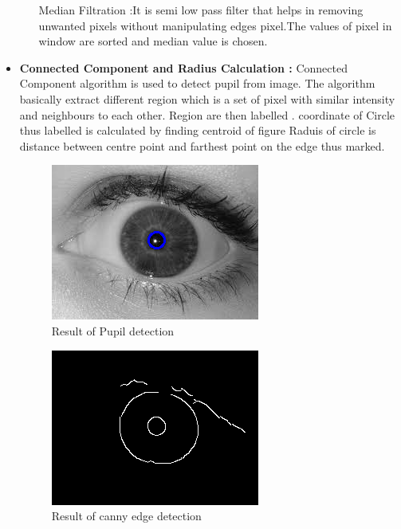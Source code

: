 \documentclass[conference]{Iris_detect}
\begin{document}
\begin{itemize}
\begin{itemize}
Median Filtration :It is semi low pass filter that helps in removing unwanted pixels without manipulating edges pixel.The values of pixel in window are sorted and median value is chosen. 
\end{itemize}
\item\textbf{Connected Component and Radius Calculation :} Connected Component algorithm is used to detect pupil from image. The algorithm basically extract different region which is a set of pixel with similar intensity and neighbours to each other. Region are then labelled .
coordinate of Circle thus labelled is calculated by finding centroid of figure Raduis of circle is distance between centre point and farthest point on the edge thus marked.
\begin{figure}
\includegraphics{Images/pupil_screenshot.png}
\caption{Result of Pupil detection}
\end{figure}
    \begin{figure}
\includegraphics{Images/canny_screenshot.png}
\caption{Result of canny edge detection}
\end{figure}



 
\end{itemize}
\end{document}
